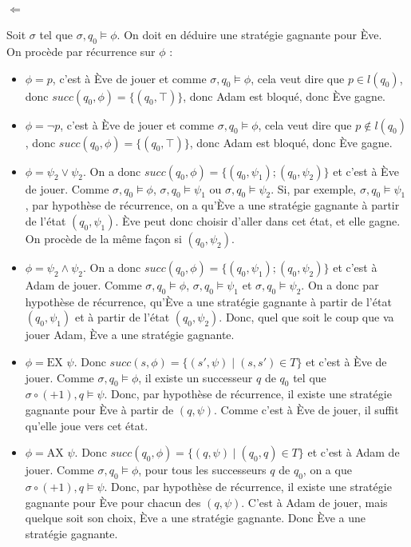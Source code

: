 \documentclass[10pt,a4paper]{article}
\begin{document}
\paragraph{$\Longleftarrow$}
Soit $\sigma$ tel que $\sigma,q_0 \vDash \phi$. On doit en déduire une stratégie gagnante pour Ève.\\
On procède par récurrence sur $\phi$ :
\begin{itemize}
\item $\phi = p$, c'est à Ève de jouer et comme $\sigma,q_0 \vDash \phi$, cela veut dire que $p \in l(q_0)$, donc $succ(q_0,\phi) = \{(q_0, \top)\}$, donc Adam est bloqué, donc Ève gagne.
\item $\phi = \neg p$, c'est à Ève de jouer et comme $\sigma,q_0 \vDash \phi$, cela veut dire que $p \notin l(q_0)$, donc $succ(q_0,\phi) = \{(q_0, \top)\}$, donc Adam est bloqué, donc Ève gagne.

\item $\phi = \psi_2 \lor \psi_2$. On a donc $succ(q_0,\phi) = \{(q_0, \psi_1); (q_0, \psi_2) \}$ et c'est à Ève de jouer. Comme $\sigma,q_0 \vDash \phi$, $\sigma,q_0 \vDash \psi_1$ ou $\sigma,q_0 \vDash \psi_2$. Si, par exemple, $\sigma,q_0 \vDash \psi_1$, par hypothèse de récurrence, on a qu'Ève a une stratégie gagnante à partir de l'état $(q_0, \psi_1)$. Ève peut donc choisir d'aller dans cet état, et elle gagne. On procède de la même façon si $(q_0, \psi_2)$.

\item $\phi = \psi_2 \land \psi_2$. On a donc $succ(q_0,\phi) = \{(q_0, \psi_1); (q_0, \psi_2) \}$ et c'est à Adam de jouer. Comme $\sigma,q_0 \vDash \phi$, $\sigma,q_0 \vDash \psi_1$ et $\sigma,q_0 \vDash \psi_2$. On a donc par hypothèse de récurrence, qu'Ève a une stratégie gagnante à partir de l'état $(q_0, \psi_1)$ et à partir de l'état $(q_0, \psi_2)$. Donc, quel que soit le coup que va jouer Adam, Ève a une stratégie gagnante.

\item $\phi = \mbox{EX } \psi$. Donc $succ(s, \phi) = \{ (s', \psi) \mid (s,s') \in T \} $ et c'est à Ève de jouer. Comme $\sigma,q_0 \vDash \phi$, il existe un successeur $q$ de $q_0$ tel que $\sigma\circ (+ 1),q \vDash \psi$. Donc, par hypothèse de récurrence, il existe une stratégie gagnante pour Ève à partir de $(q, \psi)$. Comme c'est à Ève de jouer, il suffit qu'elle joue vers cet état.

\item $\phi = \mbox{AX } \psi$. Donc $succ(q_0, \phi) = \{ (q, \psi) \mid (q_0,q) \in T \} $ et c'est à Adam de jouer. Comme $\sigma,q_0 \vDash \phi$, pour tous les successeurs $q$ de $q_0$, on a que $\sigma\circ (+ 1),q \vDash \psi$. Donc, par hypothèse de récurrence, il existe une stratégie gagnante pour Ève pour chacun des $(q, \psi)$. C'est à Adam de jouer, mais quelque soit son choix, Ève a une stratégie gagnante. Donc Ève a une stratégie gagnante.


\end{itemize}
\end{document}
